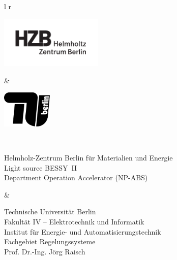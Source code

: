 
\begin{titlingpage}
    \noindent
    \renewcommand\arraystretch{0}
    \begin{tabulary}{\linewidth}{l r}
        \begin{minipage}{.45\linewidth}
            \includegraphics[height=70pt]{img/hzb_logo_schwarz}
        \end{minipage}
        &
        \begin{minipage}{.45\linewidth}
            \flushright
            \includegraphics[height=50pt]{img/TU_logo_schwarz}
        \end{minipage}
        \\
        \begin{minipage}[t]{.45\linewidth}
            \begin{SingleSpace}
                \scriptsize
                Helmholz-Zentrum Berlin für Materialien und Energie \\
                Light source BESSY~II  \\
                Department Operation Accelerator (NP-ABS)
            \end{SingleSpace}
        \end{minipage}
        &
        \begin{minipage}[t]{.45\linewidth}
            \begin{SingleSpace}
                \scriptsize
                \flushright
                Technische Universität Berlin \\
                Fakultät IV -- Elektrotechnik und Informatik  \\
                Institut für Energie- und Automatisierungstechnik \\
                Fachgebiet Regelungssysteme  \\
                Prof. Dr.-Ing. Jörg Raisch
            \end{SingleSpace}
        \end{minipage}
    \end{tabulary}


\end{titlingpage}
